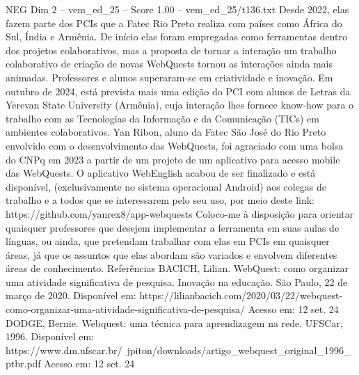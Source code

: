 \begin{textsample}{NEG Dim 2 – vem\_ed\_25 – Score 1.00 – vem\_ed\_25/t136.txt}
Desde 2022, elas fazem parte dos PCIs que a Fatec Rio Preto realiza com países como África do Sul, Índia e Armênia.
De início elas foram empregadas como ferramentas dentro dos projetos colaborativos, mas a proposta de tornar a interação um trabalho colaborativo de criação de novas WebQuests tornou as interações ainda mais animadas.
Professores e alunos superaram-se em criatividade e inovação.
Em outubro de 2024, está prevista mais uma edição do PCI com alunos de Letras da Yerevan State University (Armênia), cuja interação lhes fornece know-how para o trabalho com as Tecnologias da Informação e da Comunicação (TICs) em ambientes colaborativos.
Yan Ribon, aluno da Fatec São José do Rio Preto envolvido com o desenvolvimento das WebQuests, foi agraciado com uma bolsa do CNPq em 2023 a partir de um projeto de um aplicativo para acesso mobile das WebQuests.
O aplicativo WebEnglish acabou de ser finalizado e está disponível, (exclusivamente no sistema operacional Android) aos colegas de trabalho e a todos que se interessarem pelo seu uso, por meio deste link: https://github.com/yanrex8/app-webquests Coloco-me à disposição para orientar quaisquer professores que desejem implementar a ferramenta em suas aulas de línguas, ou ainda, que pretendam trabalhar com elas em PCIs em quaisquer áreas, já que os assuntos que elas abordam são variados e envolvem diferentes áreas de conhecimento.
Referências BACICH, Lilian.
WebQuest: como organizar uma atividade significativa de pesquisa.
Inovação na educação.
São Paulo, 22 de março de 2020.
Disponível em: https://lilianbacich.com/2020/03/22/webquest-como-organizar-uma-atividade-significativa-de-pesquisa/ Acesso em: 12 set. 24 DODGE, Bernie.
Webquest: uma técnica para aprendizagem na rede.
UFSCar, 1996.
Disponível em: https://www.dm.ufscar.br/~jpiton/downloads/artigo\_webquest\_original\_1996\_ptbr.pdf Acesso em: 12 set. 24

\end{textsample}
